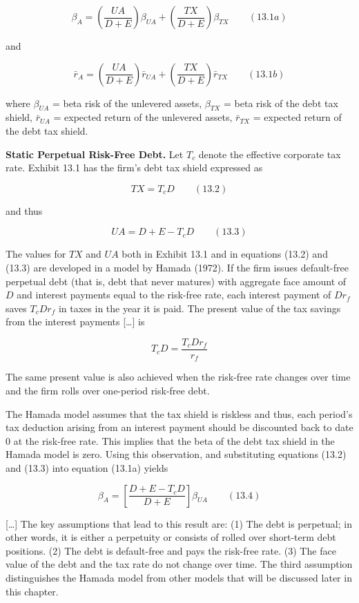 \documentclass[11pt,a4paper]{article}
\numberwithin{equation}{section}
\begin{document}
\[\beta_A = \left(\frac{UA}{D + E}\right)\beta_{UA} + \left(\frac{TX}{D + E}\right)\beta_{TX} \qquad (13.1a)\]

and

\[\bar r_A = \left(\frac{UA}{D + E}\right)\bar r_{UA} + \left(\frac{TX}{D + E}\right)\bar r_{TX} \qquad (13.1b)\]

where \(\beta_{UA}\) = beta risk of the unlevered assets, \(\beta_{TX}\) = beta risk of the debt tax
shield, \(\bar r_{UA}\) = expected return of the unlevered assets, \(\bar r_{TX}\) = expected return
of the debt tax shield.

\textbf{Static Perpetual Risk-Free Debt.} Let \(T_c\) denote the effective corporate tax rate.
Exhibit 13.1 has the firm's debt tax shield expressed as

\[TX = T_c D \qquad (13.2)\]

and thus

\[UA = D + E - T_c D \qquad (13.3)\]

The values for \(TX\) and \(UA\) both in Exhibit 13.1 and in equations (13.2) and (13.3) are
developed in a model by Hamada (1972). If the firm issues default-free perpetual debt (that is, debt
that never matures) with aggregate face amount of \(D\) and interest payments equal to the risk-free
rate, each interest payment of \(D r_f\) saves \(T_c D r_f\) in taxes in the year it is paid. The
present value of the tax savings from the interest payments {[}\ldots{]} is

\[T_c D = \frac{T_c D r_f}{r_f}\]

The same present value is also achieved when the risk-free rate changes over time and the firm rolls
over one-period risk-free debt.

The Hamada model assumes that the tax shield is riskless and thus, each period's tax deduction
arising from an interest payment should be discounted back to date 0 at the risk-free rate. This
implies that the beta of the debt tax shield in the Hamada model is zero. Using this observation,
and substituting equations (13.2) and (13.3) into equation (13.1a) yields

\[\beta_A = \left[\frac{D + E - T_c D}{D + E}\right]\beta_{UA} \qquad (13.4)\]

{[}\ldots{]} The key assumptions that lead to this result are: (1) The debt is perpetual; in other
words, it is either a perpetuity or consists of rolled over short-term debt positions. (2) The debt
is default-free and pays the risk-free rate. (3) The face value of the debt and the tax rate do not
change over time. The third assumption distinguishes the Hamada model from other models that will be
discussed later in this chapter.
\end{document}
